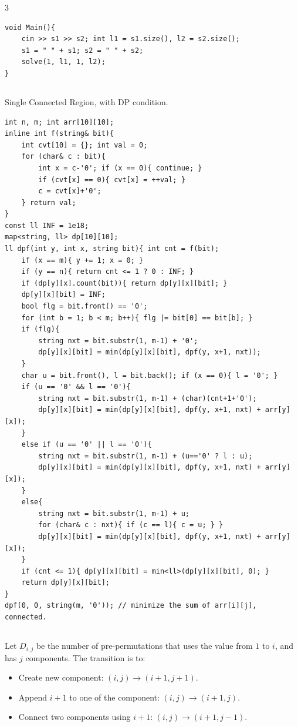 \documentclass[landscape, 8pt, a4paper, oneside]{extarticle}
\begin{document}
\begin{multicols*}{3}
\begin{verbatim}
void Main(){
	cin >> s1 >> s2; int l1 = s1.size(), l2 = s2.size();
	s1 = " " + s1; s2 = " " + s2;
	solve(1, l1, 1, l2);
}
\end{verbatim}
\subsection{}
Single Connected Region, with DP condition.

\begin{verbatim}
int n, m; int arr[10][10];
inline int f(string& bit){
	int cvt[10] = {}; int val = 0;
	for (char& c : bit){
		int x = c-'0'; if (x == 0){ continue; }
		if (cvt[x] == 0){ cvt[x] = ++val; }
		c = cvt[x]+'0';  
	} return val;
}
const ll INF = 1e18;
map<string, ll> dp[10][10];
ll dpf(int y, int x, string bit){ int cnt = f(bit);
	if (x == m){ y += 1; x = 0; }
	if (y == n){ return cnt <= 1 ? 0 : INF; }
	if (dp[y][x].count(bit)){ return dp[y][x][bit]; }
	dp[y][x][bit] = INF;
	bool flg = bit.front() == '0';
	for (int b = 1; b < m; b++){ flg |= bit[0] == bit[b]; }
	if (flg){
		string nxt = bit.substr(1, m-1) + '0';
		dp[y][x][bit] = min(dp[y][x][bit], dpf(y, x+1, nxt));
	}
	char u = bit.front(), l = bit.back(); if (x == 0){ l = '0'; }
	if (u == '0' && l == '0'){
		string nxt = bit.substr(1, m-1) + (char)(cnt+1+'0');
		dp[y][x][bit] = min(dp[y][x][bit], dpf(y, x+1, nxt) + arr[y][x]);
	}
	else if (u == '0' || l == '0'){
		string nxt = bit.substr(1, m-1) + (u=='0' ? l : u);
		dp[y][x][bit] = min(dp[y][x][bit], dpf(y, x+1, nxt) + arr[y][x]);
	}
	else{
		string nxt = bit.substr(1, m-1) + u;
		for (char& c : nxt){ if (c == l){ c = u; } }
		dp[y][x][bit] = min(dp[y][x][bit], dpf(y, x+1, nxt) + arr[y][x]);
	}
	if (cnt <= 1){ dp[y][x][bit] = min<ll>(dp[y][x][bit], 0); }
	return dp[y][x][bit];
}
dpf(0, 0, string(m, '0')); // minimize the sum of arr[i][j], connected.
\end{verbatim}
\subsection{}
Let $D_{i,j}$ be the number of pre-permutations that uses the value from $1$ to $i$, and has $j$ components.
The transition is to:
\begin{itemize}
	\item Create new component: $(i, j) \to (i+1, j+1)$.
	\item Append $i+1$ to one of the component: $(i, j) \to (i+1, j)$.
	\item Connect two components using $i+1$: $(i, j) \to (i+1, j-1)$.
\end{itemize}


\end{multicols*}
\end{document}
